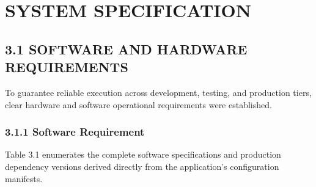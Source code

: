\documentclass[12pt,a4paper,oneside]{report}
\begin{document}
\chapter{SYSTEM SPECIFICATION}

\section{3.1 SOFTWARE AND HARDWARE REQUIREMENTS}
To guarantee reliable execution across development, testing, and production tiers, clear hardware and software operational requirements were established.

\subsection{3.1.1 Software Requirement}
Table 3.1 enumerates the complete software specifications and production dependency versions derived directly from the application's configuration manifests.
\end{document}
